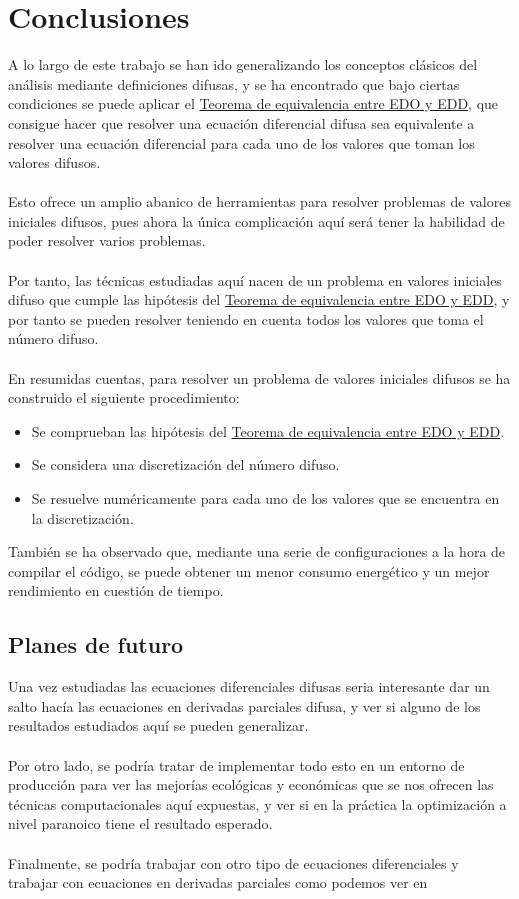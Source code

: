 \chapter{Conclusiones}
A lo largo de este trabajo se han ido generalizando los conceptos clásicos del análisis mediante definiciones difusas, y se ha encontrado que bajo ciertas condiciones se puede aplicar el \hyperref[teorema:equivalencia]{Teorema de equivalencia entre EDO y EDD}, que consigue hacer que resolver una ecuación diferencial difusa sea equivalente a resolver una ecuación diferencial para cada uno de los valores que toman los valores difusos. 
\\ \\
Esto ofrece un amplio abanico de herramientas para resolver problemas de valores iniciales difusos, pues ahora la única complicación aquí será tener la habilidad de poder resolver varios problemas.
\\ \\
Por tanto, las técnicas estudiadas aquí nacen de un problema en valores iniciales difuso que cumple las hipótesis del \hyperref[teorema:equivalencia]{Teorema de equivalencia entre EDO y EDD}, y por tanto se pueden resolver teniendo en cuenta todos los valores que toma el número difuso.
\\ \\
En resumidas cuentas, para resolver un problema de valores iniciales difusos se ha construido el siguiente procedimiento:
\begin{itemize}
	\item Se comprueban las hipótesis del \hyperref[teorema:equivalencia]{Teorema de equivalencia entre EDO y EDD}.
	
	\item Se considera una discretización del número difuso.
	
	\item Se resuelve numéricamente para cada uno de los valores que se encuentra en la discretización.
\end{itemize}
También se ha observado que, mediante una serie de configuraciones a la hora de compilar el código, se puede obtener un menor consumo energético y un mejor rendimiento en cuestión de tiempo.

\section{Planes de futuro}
Una vez estudiadas las ecuaciones diferenciales difusas seria interesante dar un salto hacía las ecuaciones en derivadas parciales difusa, y ver si alguno de los resultados estudiados aquí se pueden generalizar.
\\ \\
Por otro lado, se podría tratar de implementar todo esto en un entorno de producción para ver las mejorías ecológicas y económicas que se nos ofrecen las técnicas computacionales aquí expuestas, y ver si en la práctica la optimización a nivel paranoico tiene el resultado esperado. \\ \\
Finalmente, se podría trabajar con otro tipo de ecuaciones diferenciales y trabajar con ecuaciones en derivadas parciales como podemos ver en \cite{difffuzzy2}